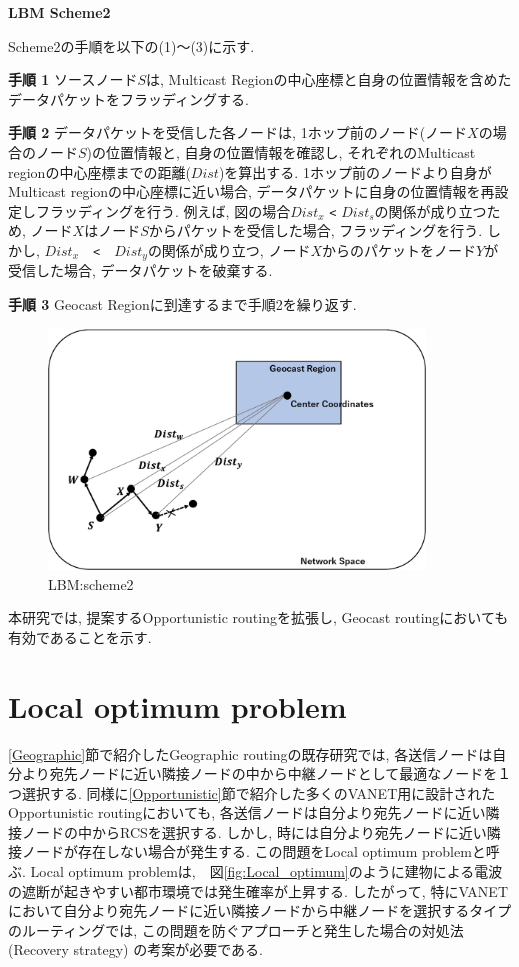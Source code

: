 \documentclass[10pt]{jreport}
\begin{document}
\par
\vspace{5mm}
\noindent
\textbf{LBM Scheme2}
\vspace{5mm}

Scheme2の手順を以下の(1)～(3)に示す.


\textbf{手順 1} ソースノード$S$は, Multicast Regionの中心座標と自身の位置情報を含めたデータパケットをフラッディングする.

\textbf{手順 2} データパケットを受信した各ノードは, 1ホップ前のノード(ノード$X$の場合のノード$S$)の位置情報と, 自身の位置情報を確認し, それぞれのMulticast regionの中心座標までの距離($Dist$)を算出する. 1ホップ前のノードより自身がMulticast regionの中心座標に近い場合, データパケットに自身の位置情報を再設定しフラッディングを行う.
例えば, 図の場合$Dist_x$ \verb|<| $Dist_s$の関係が成り立つため, ノード$X$はノード$S$からパケットを受信した場合, フラッディングを行う. しかし, $Dist_x$　\verb|<|　$Dist_y$の関係が成り立つ, ノード$X$からのパケットをノード$Y$が受信した場合, データパケットを破棄する.

\textbf{手順 3} Geocast Regionに到達するまで手順2を繰り返す.



\begin{figure}[!ht]
	\centering
	\includegraphics[width=100mm]{figures/Scheme2.eps}
	\caption{LBM:scheme2}
	\label{fig:scheme2}
\end{figure}

本研究では, 提案するOpportunistic routingを拡張し, Geocast routingにおいても有効であることを示す.



\section{Local optimum problem}
\label{local_optimum_problem}
\ref{Geographic}節で紹介したGeographic routingの既存研究では, 各送信ノードは自分より宛先ノードに近い隣接ノードの中から中継ノードとして最適なノードを１つ選択する. 同様に\ref{Opportunistic}節で紹介した多くのVANET用に設計されたOpportunistic routingにおいても, 各送信ノードは自分より宛先ノードに近い隣接ノードの中からRCSを選択する. しかし, 時には自分より宛先ノードに近い隣接ノードが存在しない場合が発生する. この問題をLocal optimum problem\cite{6}と呼ぶ. Local optimum problemは,　図\ref{fig:Local_optimum}のように建物による電波の遮断が起きやすい都市環境では発生確率が上昇する. したがって, 特にVANETにおいて自分より宛先ノードに近い隣接ノードから中継ノードを選択するタイプのルーティングでは, この問題を防ぐアプローチと発生した場合の対処法(Recovery strategy) の考案が必要である.
\end{document}
